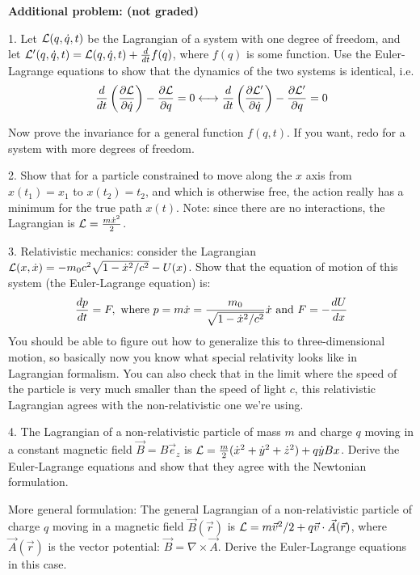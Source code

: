 \documentclass{article}
\newcommand{\e}[1]{\vec{e}_{#1}}
\newcommand{\x}[1]{\dot{#1}}
\newcommand{\p}[1]{\partial #1}
\begin{document}
\newpage

{\bf Additional problem: (not graded)}

\vspace{10mm}

1.  Let ${\cal L}(q,\x q, t)$ be the Lagrangian of a system with one
   degree of freedom, and let ${\cal L}'(q,\x q, t) = {\cal L}(q,\x q,
   t) + {d \over dt} f(q)$, where $f(q)$ is some function. Use the
   Euler-Lagrange equations to show that the dynamics of the two systems is
   identical, i.e.
$$ 
   {d \over dt} \left(\frac{\p {\cal L}}{\p \x q} \right) - \frac{\p
   {\cal L}}{\p q} = 0 \longleftrightarrow  {d \over dt}
   \left(\frac{\p {\cal L}'}{\p \x q} \right) - \frac{\p  {\cal
   L}'}{\p q} = 0 
$$ 

   Now prove the invariance for a general function $f(q,t)$. If you want, redo for a system with more degrees of freedom.


\vspace{10mm}
   
2. Show that for a particle constrained to move along
the $x$ axis from $x(t_1)=x_1$ to $x(t_2)=t_2$, and which is otherwise free,
the action really has
a minimum for the true path $x(t)$. Note: since there are no
interactions, the  Lagrangian is ${\cal L} = {m\x x^2\over 2}$.



\vspace{10mm}

3. Relativistic mechanics: consider the Lagrangian ${\cal L}(x,\x x) =
   - m_0 c^2 \sqrt{1-\x x^2/c^2} - U(x)$. Show that the equation of
   motion of this system (the Euler-Lagrange equation) is:
$$
{d  p \over dt} = F, \mbox{      where    }
p = m \x x = { m_0 \over \sqrt{1-\x x^2/c^2}} \x x \mbox{ and } F = -{
  dU\over dx}
$$
You should be able to figure out how to generalize this to three-dimensional motion, so basically now you know what special relativity looks like in Lagrangian formalism. You can also check that in the limit where the speed of the particle is very much smaller than the speed of light $c$, this relativistic Lagrangian agrees with the non-relativistic one we're using. 



\vspace{10mm}

4. 
 The Lagrangian of a non-relativistic particle of mass $m$ and charge $q$ moving in a constant magnetic field
   $\vec{B}=B\e z$ is ${\cal L} =  {m \over 2} (\x x^2 + \x y^2 + \x
   z^2) + q \x y Bx$. Derive the Euler-Lagrange equations and show that
   they agree with the Newtonian formulation. 

   More general formulation: The general Lagrangian of a non-relativistic particle of
charge $q$ moving in a magnetic field $\vec{B}(\vec{r})$ is ${\cal L}
= m\vec{v}^2/2 + q \vec{v}\cdot\vec{A}(\vec{r})$, where
$\vec{A}(\vec{r})$ is the vector potential: $\vec{B} = \nabla \times
\vec{A}$. Derive  the Euler-Lagrange equations in this case. 
\end{document}
